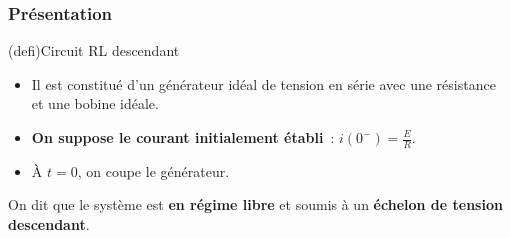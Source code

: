 \documentclass[../../main/main.tex]{subfiles}
\begin{document}
\subsubsection{Présentation}
\begin{tcb*}[sidebyside, righthand ratio=.30](defi){Circuit RL descendant}
  \begin{itemize}
		\item Il est constitué d'un générateur idéal de tension en série avec une
		      résistance et une bobine idéale.
		\item \textbf{On suppose le courant initialement établi}~: $i(0^-) =
			      \frac{E}{R}$.
		\item À $t=0$, on coupe le générateur.
  \end{itemize}
  On dit que le système est \textbf{en régime libre} et soumis à un
  \textbf{échelon de tension descendant}.
\tcblower
  \begin{center}
\end{center}
\end{tcb*}
\end{document}
